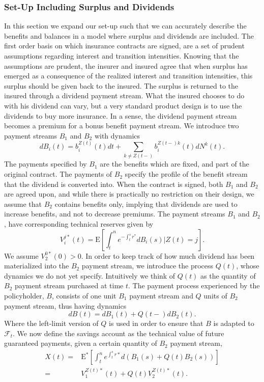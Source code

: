 \documentclass[12pt]{article}
\newcommand{\E}{\text{E}}
\theoremstyle{my_thm}
\begin{document}
\subsubsection{Set-Up Including Surplus and Dividends}
In this section we expand our set-up such that we can accurately describe the benefits and balances in a model where surplus and dividends are included. The first order basis on which insurance contracts are signed, are a set of prudent assumptions regarding interest and transition intensities. Knowing that the assumptions are prudent, the insurer and insured agree that when surplus has emerged as a consequence of the realized interest and transition intensities, this surplus should be given back to the insured. The surplus is returned to the insured through a dividend payment stream. What the insured chooses to do with his dividend can vary, but a very standard product design is to use the dividends to buy more insurance. In a sense, the dividend payment stream becomes a premium for a bonus benefit payment stream. We introduce two payment streams $B_1$ and $B_2$ with dynamics
$$
dB_i(t)=b_i^{Z(t)}(t) dt +\sum_{k \neq Z(t-)} b_i^{Z(t-)k}(t)dN^k(t).
$$
The payments specified by $B_1$ are the benefits which are fixed, and part of the original contract. The payments of $B_2$ specify the profile of the benefit stream that the dividend is converted into. When the contract is signed, both $B_1$ and $B_2$ are agreed upon, and while there is practically no restriction on their design, we assume that $B_2$ contains benefits only, implying that dividends are used to increase benefits, and not to decrease premiums. The payment streams $B_1$ and $B_2$, have corresponding technical reserves given by
$$
V_i^{j*}(t)=\E \left[ \int_t^n e^{-\int_t^s r^*} dB_i(s) \big| Z(t)=j \right].
$$
We assume $V_2^{0*}(0)>0$. In order to keep track of how much dividend has been materialized into the $B_2$ payment stream, we introduce the process $Q(t)$, whose dynamics we do not yet specify. Intuitively we think of $Q(t)$ as the quantity of $B_2$ payment stream purchased at time $t$. The payment process experienced by the policyholder, $B$, consists of one unit $B_1$ payment stream and $Q$ units of $B_2$ payment stream, thus having dynamics
$$
dB(t)=dB_1(t)+ Q(t-)dB_2(t).
$$
Where the left-limit version of $Q$ is used in order to ensure that $B$ is adapted to $\mathcal{F}_t$. We now define the savings account as the technical value of future guaranteed payments, given a certain quantity of $B_2$ payment stream,
\begin{align*}
X(t)=&\E^*\left[ \int_t^n e^{\int_t^s r*} d\left( B_1(s) + Q(t) B_2(s) \right) \right]
\\
=&
V_1^{Z(t)*}(t)+Q(t)V_2^{Z(t)*}(t). 
\end{align*}
\end{document}

